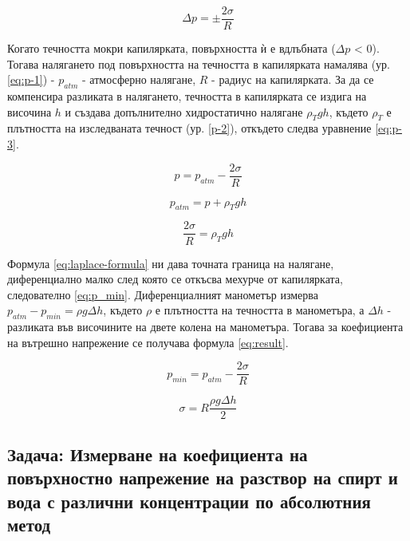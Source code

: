 \documentclass[12pt]{article}
\begin{document}
\begin{equation}\label{eq:laplace-formula}
    \Delta p = \pm \frac{2\sigma}{R}
\end{equation}

Когато течността мокри капилярката, повърхността ѝ е вдлъбната ($\Delta p$ < 0). Тогава налягането под повърхността на течността в капилярката намалява (ур. \ref{eq:p-1}) - $p_{atm}$ - атмосферно налягане, $R$ - радиус на капилярката. За да се компенсира разликата в налягането, течността в капилярката се издига на височина $h$ и създава допълнително хидростатично налягане $\rho_Tgh$, където $\rho_T$ е плътността на изследваната течност (ур. \ref{p-2}), откъдето следва уравнение \ref{eq:p-3}. 

\begin{equation}\label{eq:p-1}
    p = p_{atm} - \frac{2\sigma}{R}
\end{equation}

\begin{equation}\label{eq:p-2}
    p_{atm} = p + \rho_Tgh
\end{equation}

\begin{equation}\label{eq:p-3}
    \frac{2\sigma}{R} = \rho_Tgh
\end{equation}

Формула \ref{eq:laplace-formula} ни дава точната граница на налягане, диференциално малко след която се откъсва мехурче от капилярката, следователно \ref{eq:p_min}. Диференциалният манометър измерва $p_{atm} - p_{min} = \rho g \Delta h$, където $\rho$ е плътността на течността в манометъра, а $\Delta h$ - разликата във височините на двете колена на манометъра. Тогава за коефициента на вътрешно напрежение се получава формула \ref{eq:result}.

\begin{equation}\label{eq:p-min}
    p_{min} = p_{atm} - \frac{2\sigma}{R}
\end{equation}

\begin{equation}\label{eq:result}
    \sigma = R\frac{\rho g \Delta h}{2}
\end{equation}

\subsection{Задача: Измерване на коефициента на повърхностно напрежение на разствор на спирт и вода с различни концентрации по абсолютния метод}
\end{document}
